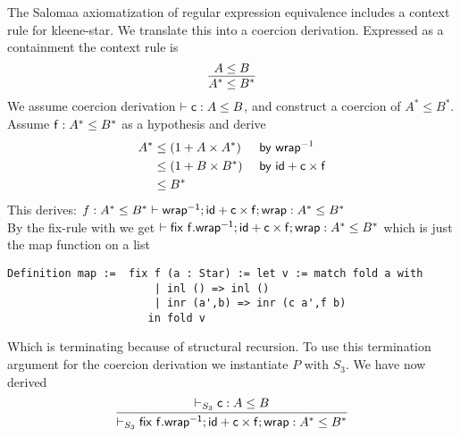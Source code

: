 \begin{example}[Salomaa]\label{ex:map}
The Salomaa axiomatization of regular expression equivalence includes a context rule for kleene-star. We translate this into a coercion derivation. Expressed as a containment the context rule is
\[ \infer{A^* \leq B^*}{A\leq B} \]
We assume coercion derivation $\vdash \mathsf{c} : A \leq B$, and construct a coercion of $ A^* \leq B^*$.\\
Assume $\mathsf{f}: A^* \leq B^*$ as a hypothesis and derive
\begin{align*}
  A^* &\leq (1 + A \times A^*) && \textsf{ by} ~\mathsf{wrap}^{-1}\\
&\leq  (1 + B \times B^*) &&\textsf{ by} ~\mathsf{id}+ \mathsf{c} \times \mathsf{f}\\
&\leq B^*
\end{align*}
This derives:
$f : A^* \leq B^* \vdash \mathsf{\mathsf{wrap}^{-1} ; \mathsf{id} + \mathsf{c} \times \mathsf{f};  \mathsf{wrap}} : A^* \leq B^*$\\
By the fix-rule with %
we get $\vdash \mathsf{\mathsf{fix}~f. \mathsf{wrap}^{-1} ; \mathsf{id} + \mathsf{c} \times \mathsf{f};  \mathsf{wrap}} : A^* \leq B^*$ which is just the map function on a list 
\begin{verbatim}
Definition map :=  fix f (a : Star) := let v := match fold a with 
                       | inl () => inl ()
                       | inr (a',b) => inr (c a',f b)
                      in fold v
\end{verbatim}
Which is terminating because of structural recursion. To use this termination argument for the coercion derivation we instantiate $P$ with $S_3$. We have now derived
\[\infer{\containsP{}{\fix~f. \dslcominv{wrap} ; \dslcom{id} + \dslcom{c} \times \dslcom{f};  \dslcom{wrap}}{A^*}{B^*}{S_3}}{\containsP{}{c}{A}{B}{S_3}}\]
\end{example}



